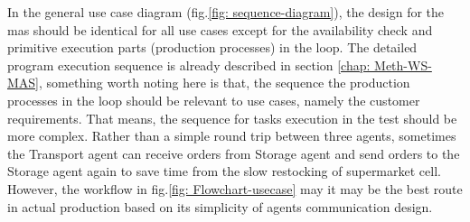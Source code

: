 In the general use case diagram (fig.\ref{fig: sequence-diagram}), the 
design for the \gls{mas} should be identical for all use cases except for 
the availability check and primitive execution parts (production processes) 
in the loop. The detailed 
program execution sequence is already described in section \ref{chap: Meth-WS-MAS}, 
something worth noting here is that, the sequence the production processes in the loop should 
be relevant to use cases, namely the customer requirements. That means, the sequence 
for tasks execution in the test should be more complex. Rather than a simple round trip 
between three agents, sometimes the Transport agent can receive orders from Storage agent 
and send orders to the Storage agent again to save time from the slow restocking of 
supermarket cell. However, the workflow in fig.\ref{fig: Flowchart-usecase} may 
it may be the best route in actual production based on its simplicity of agents 
communication design.  



